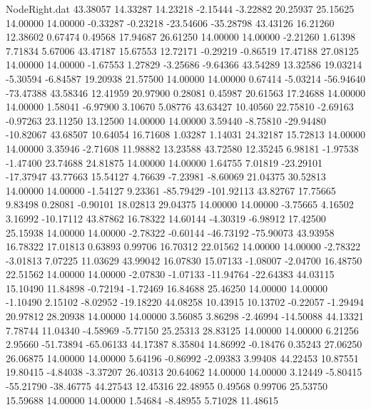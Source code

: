 \begin{filecontents}{NodeRight.dat}
  43.38057   14.33287   14.23218    -2.15444   -3.22882   20.25937   25.15625   14.00000   14.00000   -0.33287   -0.23218  -23.54606  -35.28798
  43.43126   16.21260   12.38602     0.67474    0.49568   17.94687   26.61250   14.00000   14.00000   -2.21260    1.61398    7.71834    5.67006
  43.47187   15.67553   12.72171    -0.29219   -0.86519   17.47188   27.08125   14.00000   14.00000   -1.67553    1.27829   -3.25686   -9.64366
  43.54289   13.32586   19.03214    -5.30594   -6.84587   19.20938   21.57500   14.00000   14.00000    0.67414   -5.03214  -56.94640  -73.47388
  43.58346   12.41959   20.97900     0.28081    0.45987   20.61563   17.24688   14.00000   14.00000    1.58041   -6.97900    3.10670    5.08776
  43.63427   10.40560   22.75810    -2.69163   -0.97263   23.11250   13.12500   14.00000   14.00000    3.59440   -8.75810  -29.94480  -10.82067
  43.68507   10.64054   16.71608     1.03287    1.14031   24.32187   15.72813   14.00000   14.00000    3.35946   -2.71608   11.98882   13.23588
  43.72580   12.35245    6.98181    -1.97538   -1.47400   23.74688   24.81875   14.00000   14.00000    1.64755    7.01819  -23.29101  -17.37947
  43.77663   15.54127    4.76639    -7.23981   -8.60069   21.04375   30.52813   14.00000   14.00000   -1.54127    9.23361  -85.79429 -101.92113
  43.82767   17.75665    9.83498     0.28081   -0.90101   18.02813   29.04375   14.00000   14.00000   -3.75665    4.16502    3.16992  -10.17112
  43.87862   16.78322   14.60144    -4.30319   -6.98912   17.42500   25.15938   14.00000   14.00000   -2.78322   -0.60144  -46.73192  -75.90073
  43.93958   16.78322   17.01813     0.63893    0.99706   16.70312   22.01562   14.00000   14.00000   -2.78322   -3.01813    7.07225   11.03629
  43.99042   16.07830   15.07133    -1.08007   -2.04700   16.48750   22.51562   14.00000   14.00000   -2.07830   -1.07133  -11.94764  -22.64383
  44.03115   15.10490   11.84898    -0.72194   -1.72469   16.84688   25.46250   14.00000   14.00000   -1.10490    2.15102   -8.02952  -19.18220
  44.08258   10.43915   10.13702    -0.22057   -1.29494   20.97812   28.20938   14.00000   14.00000    3.56085    3.86298   -2.46994  -14.50088
  44.13321    7.78744   11.04340    -4.58969   -5.77150   25.25313   28.83125   14.00000   14.00000    6.21256    2.95660  -51.73894  -65.06133
  44.17387    8.35804   14.86992    -0.18476    0.35243   27.06250   26.06875   14.00000   14.00000    5.64196   -0.86992   -2.09383    3.99408
  44.22453   10.87551   19.80415    -4.84038   -3.37207   26.40313   20.64062   14.00000   14.00000    3.12449   -5.80415  -55.21790  -38.46775
  44.27543   12.45316   22.48955     0.49568    0.99706   25.53750   15.59688   14.00000   14.00000    1.54684   -8.48955    5.71028   11.48615

\end{filecontents}
